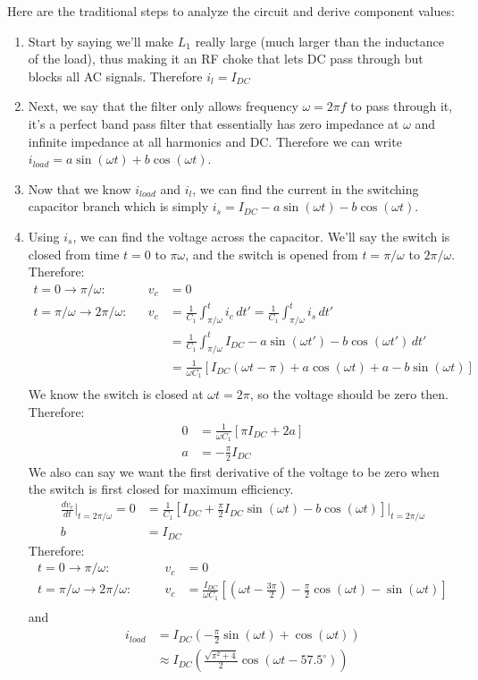\documentclass[10pt,letterpaper]{article}
\begin{document}
Here are the traditional steps to analyze the circuit and derive component values:
\begin{enumerate}
\item Start by saying we'll make $L_1$ really large (much larger than the inductance of the load), thus making it an RF choke that lets DC pass through but blocks all AC signals. Therefore $i_l=I_{DC}$
\item Next, we say that the filter only allows frequency $\omega = 2\pi f$ to pass through it, it's a perfect band pass filter that essentially has zero impedance at $\omega$ and infinite impedance at all harmonics and DC. Therefore we can write $i_{load}=a\sin(\omega t)+ b\cos(\omega t)$.
\item Now that we know $i_{load}$ and $i_l$, we can find the current in the switching capacitor branch which is simply $i_s=I_{DC}-a\sin(\omega t)- b\cos(\omega t)$.
\item Using $i_s$, we can find the voltage across the capacitor. We'll say the switch is closed from time $t=0$ to $\pi \omega$, and the switch is opened from $t=\pi/ \omega$ to $2 \pi / \omega$. Therefore:
\begin{align*}
t=0\rightarrow \pi/\omega: && v_c &=0\\
t=\pi/\omega \rightarrow 2\pi/\omega: &&v_c &=\frac{1}{C_1}\int_{\pi/\omega}^{t} i_c\,dt'=\frac{1}{C_1}\int_{\pi/\omega}^{t} i_s\,dt'\\
&& &= \frac{1}{C_1}\int_{\pi/\omega}^{t} I_{DC}-a\sin(\omega t')- b\cos(\omega t')\,dt'\\
&& &= \frac{1}{\omega C_1}\left[ I_{DC}\left(\omega t- \pi \right)+a \cos(\omega t)+ a - b \sin(\omega t) \right] \\
\end{align*}
We know the switch is closed at $\omega t=2\pi$, so the voltage should be zero then. Therefore:
\begin{align*}
0 &= \frac{1}{\omega C_1}\left[ \pi I_{DC}+2a \right]\\
a &= -\frac{\pi}{2} I_{DC}
\end{align*}
We also can say we want the first derivative of the voltage to be zero when the switch is first closed for maximum efficiency.
\begin{align*}
\frac{dv_c}{dt}\Bigr|_{t=2\pi/\omega}=0 &=  \frac{1}{C_1}\left[ I_{DC}+\frac{\pi}{2} I_{DC}\sin(\omega t)- b\cos(\omega t) \right]\Bigr|_{t=2\pi/\omega}\\
b&=I_{DC}
\end{align*}
Therefore:
\begin{align*}
t=0\rightarrow \pi/\omega: \quad && v_c &=0\\
t=\pi/\omega \rightarrow 2\pi/\omega: \quad &&v_c &=\frac{I_{DC}}{\omega C_1}\left[ \left(\omega t-\frac{3\pi}{2}\right)-\frac{\pi}{2} \cos(\omega t)-\sin(\omega t) \right] \\
\end{align*}
and
\begin{align*}
i_{load}&=I_{DC}\left( -\frac{\pi}{2}\sin(\omega t)+ \cos(\omega t)\right)\\
&\approx I_{DC} \left( 
\frac{\sqrt{\pi^2+4}}{2}\cos
 \left( \omega t-57.5^\circ
 \right)
\right)
\end{align*}



\end{enumerate}
\end{document}
